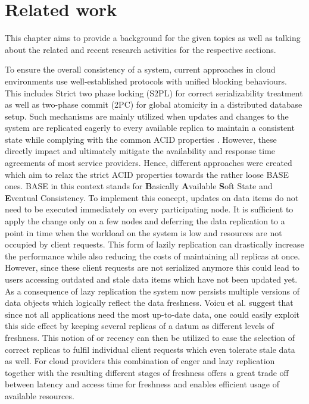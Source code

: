 
\chapter{Related work}
\label{c:related}

This chapter aims to provide a background for the given topics as well as talking about the related and recent research activities for the respective sections.


To ensure the overall consistency of a system, current approaches in cloud environments use well-established protocols with unified blocking behaviours. 
This includes Strict two phase locking (S2PL) for correct serializability treatment as well as two-phase commit (2PC) for global atomicity in a distributed database 
setup. Such mechanisms are mainly utilized when updates and changes to the system are replicated eagerly to every available replica to maintain a consistent state
while complying with the common ACID properties \cite{tamer:2005}.
However, these  directly impact and ultimately mitigate the availability and response time agreements of most service providers.
Hence, different approaches were created which aim to relax the strict ACID properties towards the rather loose BASE ones.
BASE in this context stands for \textbf{B}asically \textbf{A}vailable \textbf{S}oft State and \textbf{E}ventual Consistency\cite{shapiro:2011}.
To implement this concept, updates on data items do not need to be executed immediately on every participating node.
It is sufficient to apply the change only on a few nodes and deferring the data replication to a point in time when the workload on the system is low and 
resources are not occupied by client requests. This form of lazily replication can drastically increase the performance while also reducing the costs of maintaining
all replicas at once. However, since these client requests are not serialized anymore this could lead to users accessing outdated and stale data items
which have not been updated yet.
As a consequence of lazy replication the system now persists multiple versions of data objects which logically reflect the data freshness.
Voicu et al. \cite{voicu:2010} suggest that since not all applications need the most up-to-date data, one could easily exploit 
this side effect by keeping several replicas of a datum as different levels of freshness.
This notion of or recency can then be utilized to ease the selection of correct replicas to fulfil individual client requests which even tolerate stale data as well.
For cloud providers this combination of eager and lazy replication together with the resulting different stages of freshness 
offers a great trade off between latency and access time for freshness and enables efficient usage of available resources.


